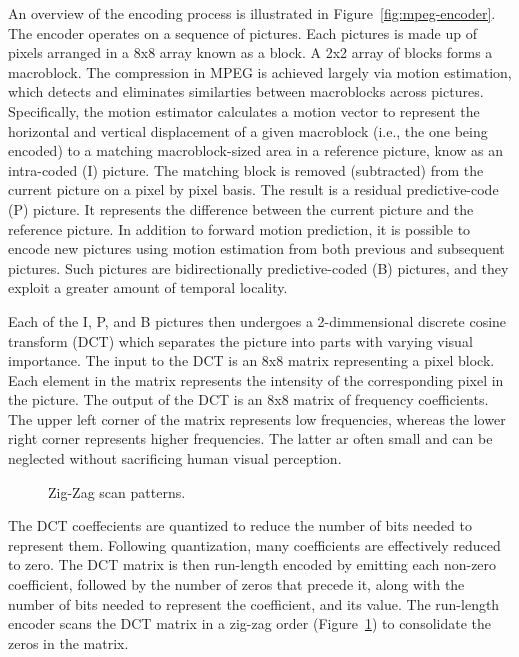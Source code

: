 An overview of the encoding process is illustrated in
Figure~\ref{fig:mpeg-encoder}. The encoder operates on a sequence of
pictures. Each pictures is made up of pixels arranged in a 8x8 array
known as a block. A 2x2 array of blocks forms a macroblock. The
compression in MPEG is achieved largely via motion estimation, which
detects and eliminates similarties between macroblocks across
pictures.  Specifically, the motion estimator calculates a motion
vector to represent the horizontal and vertical displacement of a
given macroblock (i.e., the one being encoded) to a matching
macroblock-sized area in a reference picture, know as an intra-coded
(I) picture. The matching block is removed (subtracted) from the
current picture on a pixel by pixel basis. The result is a residual
predictive-code (P) picture. It represents the difference between the
current picture and the reference picture. In addition to forward
motion prediction, it is possible to encode new pictures using motion
estimation from both previous and subsequent pictures. Such pictures
are bidirectionally predictive-coded (B) pictures, and they exploit a
greater amount of temporal locality.

Each of the I, P, and B pictures then undergoes a 2-dimmensional
discrete cosine transform (DCT) which separates the picture into parts
with varying visual importance. The input to the DCT is an 8x8 matrix
representing a pixel block. Each element in the matrix represents the
intensity of the corresponding pixel in the picture. The output of the
DCT is an 8x8 matrix of frequency coefficients. The upper left corner
of the matrix represents low frequencies, whereas the lower right
corner represents higher frequencies. The latter ar often small and
can be neglected without sacrificing human visual perception.

\begin{figure}[t]
\begin{center}
\vspace{-12pt}
 \caption{Zig-Zag scan patterns.}
 \label{fig:zigzag}
\end{center}
\end{figure}

The DCT coeffecients are quantized to reduce the number of bits needed
to represent them. Following quantization, many coefficients are
effectively reduced to zero. The DCT matrix is then run-length
encoded by emitting each non-zero coefficient, followed by the number
of zeros that precede it, along with the number of bits needed to
represent the coefficient, and its value. The run-length encoder
scans the DCT matrix in a zig-zag order (Figure~\ref{fig:zigzag}) to
consolidate the zeros in the matrix.

